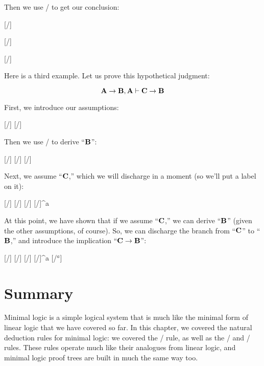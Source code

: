 \documentclass[../../../main.tex]{subfiles}
\begin{document}
\noindent
Then we use \implElim/ to get our conclusion:

\begin{prooftree*}
  \hypo{}
  [\startrule/]{}
  
  \hypo{}
  [\startrule/]{}
  
  [\implElim/]{}
\end{prooftree*}

\noindent
Here is a third example. Let us prove this hypothetical judgment:

\begin{equation*}
  \nd{A \impl/ B}, \nd{A} \ndturnstile/ \nd{C \impl/ B}
\end{equation*}

\noindent
First, we introduce our assumptions:

\begin{prooftree*}
  \hypo{}
  [\startrule/]{}
  \hypo{}
  [\startrule/]{}
\end{prooftree*}

\noindent
Then we use \implElim/ to derive ``$\mathbf{B}$'':

\begin{prooftree*}
  \hypo{}
  [\startrule/]{}
  \hypo{}
  [\startrule/]{}
  [\implElim/]{}
\end{prooftree*}

\noindent
Next, we assume ``$\mathbf{C}$,'' which we will discharge in a moment (so we'll put a label on it):

\begin{prooftree*}
  \hypo{}
  [\startrule/]{}
  \hypo{}
  [\startrule/]{}
  [\implElim/]{}
  \hypo{}
  [\startrule/]{^{a}}
\end{prooftree*}

\noindent
At this point, we have shown that if we assume ``$\mathbf{C}$,'' we can derive ``$\mathbf{B}$'' (given the other assumptions, of course). So, we can discharge the branch from ``$\mathbf{C}$'' to  ``$\mathbf{B}$,'' and introduce the implication ``$\nd{C \impl/ B}$'':

\begin{prooftree*}
  \hypo{}
  [\startrule/]{}
  \hypo{}
  [\startrule/]{}
  [\implElim/]{}
  \hypo{}
  [\startrule/]{^{a}}
  [\implIntro/$^{a}$]{}
\end{prooftree*}


\section{Summary}

Minimal logic is a simple logical system that is much like the minimal form of linear logic that we have covered so far. In this chapter, we covered the natural deduction rules for minimal logic: we covered the \startrule/ rule, as well as the \implIntro/ and \implElim/ rules. These rules operate much like their analogues from linear logic, and minimal logic proof trees are built in much the same way too.
\end{document}
